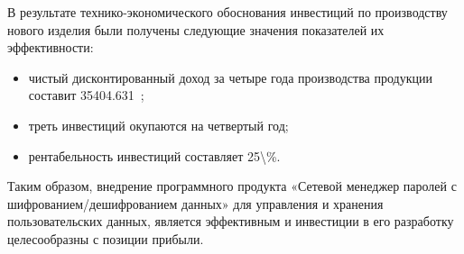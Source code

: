 В результате технико-экономического обоснования инвестиций по производству нового изделия были получены следующие значения показателей их эффективности:
\begin{itemize}
  \item чистый дисконтированный доход за четыре года производства продукции составит \num{35404,631}~\byr;
  \item треть инвестиций окупаются на четвертый год;
  \item рентабельность инвестиций составляет \num{25\%}.
\end{itemize}

Таким образом, внедрение программного продукта «Сетевой менеджер паролей с шифрованием/дешифрованием данных» для управления и хранения пользовательских данных, является эффективным и инвестиции в его разработку целесообразны с позиции прибыли.